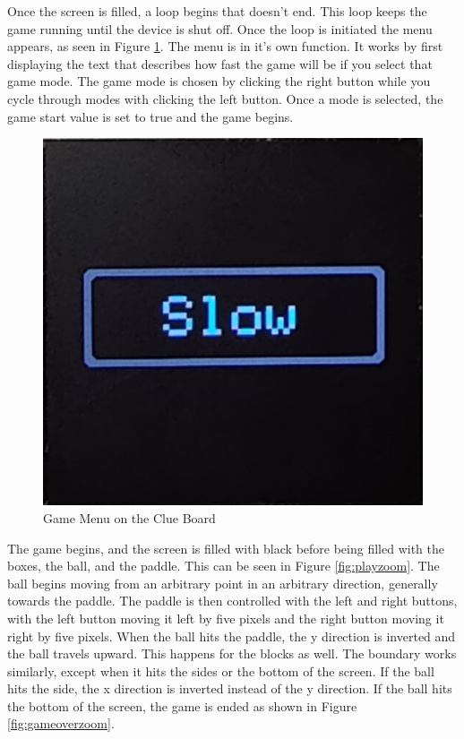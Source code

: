 \documentclass[12pt]{article}
\begin{document}
Once the screen is filled, a loop begins that doesn't end. This loop keeps the game running until the device is shut off. Once the loop is initiated the menu appears, as seen in Figure \ref{fig:menuzoom}. The menu is in it's own function. It works by first displaying the text that describes how fast the game will be if you select that game mode. The game mode is chosen by clicking the right button while you cycle through modes with clicking the left button. Once a mode is selected, the game start value is set to true and the game begins. 
\begin{figure}[!t]
\centering
\includegraphics[width=4.5in]{images/Clue_Board_Menu_Zoom.jpg}
\caption{Game Menu on the Clue Board}
\label{fig:menuzoom}
\end{figure}
The game begins, and the screen is filled with black before being filled with the boxes, the ball, and the paddle. This can be seen in Figure \ref{fig:playzoom}. The ball begins moving from an arbitrary point in an arbitrary direction, generally towards the paddle. The paddle is then controlled with the left and right buttons, with the left button moving it left by five pixels and the right button moving it right by five pixels. When the ball hits the paddle, the y direction is inverted and the ball travels upward. This happens for the blocks as well. The boundary works similarly, except when it hits the sides or the bottom of the screen. If the ball hits the side, the x direction is inverted instead of the y direction. If the ball hits the bottom of the screen, the game is ended as shown in Figure \ref{fig:gameoverzoom}. 
\end{document}

